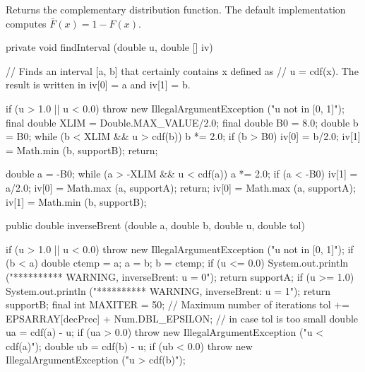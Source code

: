  \begin{tabb} Returns the complementary distribution function.
    The default implementation computes $\bar F(x) = 1 - F(x)$.
 \end{tabb}
\begin{htmlonly}
\end{htmlonly}
\begin{code}\begin{hide}

   private void findInterval (double u, double [] iv) {
      // Finds an interval [a, b] that certainly contains x defined as
      // u = cdf(x). The result is written in iv[0] = a and iv[1] = b.

      if (u > 1.0 || u < 0.0)
         throw new IllegalArgumentException ("u not in [0, 1]");
      final double XLIM =  Double.MAX_VALUE/2.0;
      final double B0 = 8.0;
      double b = B0;
      while (b < XLIM && u > cdf(b))
         b *= 2.0;
      if (b > B0) {
         iv[0] = b/2.0;
         iv[1] = Math.min (b, supportB);
         return;
      }

      double a = -B0;
      while (a > -XLIM && u < cdf(a))
         a *= 2.0;
      if (a < -B0) {
         iv[1] = a/2.0;
         iv[0] = Math.max (a, supportA);
         return;
      }
      iv[0] = Math.max (a, supportA);
      iv[1] = Math.min (b, supportB);
   }\end{hide}

   public double inverseBrent (double a, double b, double u, double tol) \begin{hide} {
      if (u > 1.0 || u < 0.0)
          throw new IllegalArgumentException ("u not in [0, 1]");
      if (b < a) {
         double ctemp = a;   a = b;   b = ctemp;
      }
      if (u <= 0.0) {
          System.out.println ("********** WARNING,  inverseBrent:   u = 0");
          return supportA;
      }
      if (u >= 1.0) {
          System.out.println ("********** WARNING,  inverseBrent:   u = 1");
          return supportB;
      }
      final int MAXITER = 50;      // Maximum number of iterations
      tol += EPSARRAY[decPrec] + Num.DBL_EPSILON;    // in case tol is too small
      double ua = cdf(a) - u;
      if (ua > 0.0)
          throw new IllegalArgumentException ("u < cdf(a)");
      double ub = cdf(b) - u;
      if (ub < 0.0)
          throw new IllegalArgumentException ("u > cdf(b)");

}
\end{hide}
\end{code}
